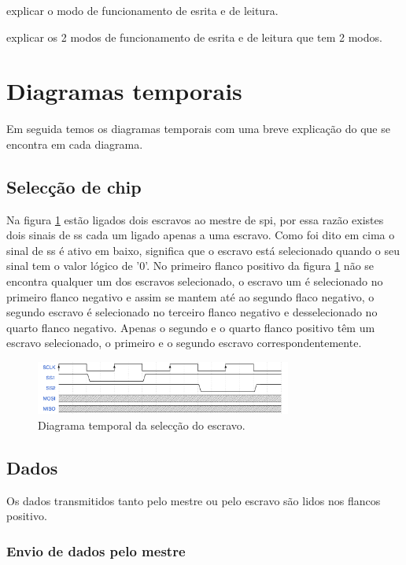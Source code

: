 explicar o modo de funcionamento de esrita e de leitura.

explicar os 2 modos de funcionamento de esrita e de leitura que tem 2 modos.

\section{Diagramas temporais}

Em seguida temos os diagramas temporais com uma breve explicação do que se encontra em cada diagrama.

\subsection{Selecção de chip}

Na figura \ref{fig:ondas_SPI_S} estão ligados dois escravos ao mestre de \acrshort{spi}, por essa razão existes dois sinais de \acrshort{ss} cada um ligado apenas a uma escravo.
Como foi dito em cima o sinal de \acrshort{ss} é ativo em baixo, significa que o escravo está selecionado quando o seu sinal tem o valor lógico de '0'. No primeiro flanco positivo da figura \ref{fig:ondas_SPI_S} não se encontra qualquer um dos escravos selecionado, o escravo um é selecionado no primeiro flanco negativo e assim se mantem até ao segundo flaco negativo, o segundo escravo é selecionado no terceiro flanco negativo e desselecionado no quarto flanco negativo. Apenas o segundo e o quarto flanco positivo têm um escravo selecionado, o primeiro e o segundo escravo correspondentemente. 

\begin{figure}[!htb]
  \centering
  \includegraphics[width=0.75\textwidth]{ondas/SPI_S.pdf} %
  \caption[Diagrama temporal da selecção do escravo.]{Diagrama temporal da selecção do escravo.}
  \label{fig:ondas_SPI_S}
\end{figure}

\subsection{Dados}

Os dados transmitidos tanto pelo mestre ou pelo escravo são lidos nos flancos positivo.

\subsubsection{Envio de dados pelo mestre}

